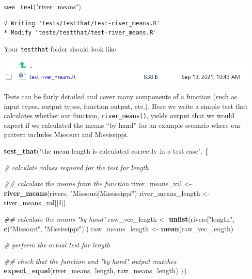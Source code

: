 \documentclass[
]{book}
\newenvironment{Shaded}{\begin{snugshade}}{\end{snugshade}}
\newcommand{\CommentTok}[1]{\textcolor[rgb]{0.56,0.35,0.01}{\textit{#1}}}
\newcommand{\DecValTok}[1]{\textcolor[rgb]{0.00,0.00,0.81}{#1}}
\newcommand{\KeywordTok}[1]{\textcolor[rgb]{0.13,0.29,0.53}{\textbf{#1}}}
\newcommand{\NormalTok}[1]{#1}
\newcommand{\StringTok}[1]{\textcolor[rgb]{0.31,0.60,0.02}{#1}}
\begin{document}
\begin{Shaded}
\begin{Highlighting}[]
\KeywordTok{use_test}\NormalTok{(}\StringTok{"river_means"}\NormalTok{)}
\end{Highlighting}
\end{Shaded}

\begin{verbatim}
√ Writing 'tests/testthat/test-river_means.R'
* Modify 'tests/testthat/test-river_means.R'
\end{verbatim}

Your \texttt{testthat} folder should look like

\includegraphics[width=1\linewidth]{images/newrpack_files5}

Tests can be fairly detailed and cover many components of a function (such as input types, output types, function output, etc.). Here we write a simple test that calculates whether our function, \texttt{river\_means()}, yields output that we would expect if we calculated the means ``by hand'' for an example scenario where our pattern includes Missouri and Mississippi.

\begin{Shaded}
\begin{Highlighting}[]
\KeywordTok{test_that}\NormalTok{(}\StringTok{"the mean length is calculated correctly in a test case"}\NormalTok{, \{}
  
  \CommentTok{# calculate values required for the test for length}

  \CommentTok{## calculate the means from the function}
\NormalTok{  river_means_val <-}\StringTok{ }\KeywordTok{river_means}\NormalTok{(rivers, }\StringTok{"Missouri|Mississippi"}\NormalTok{)}
\NormalTok{  river_means_length <-}\StringTok{ }\NormalTok{river_means_val[[}\DecValTok{1}\NormalTok{]]}

  \CommentTok{## calculate the means "by hand"}
\NormalTok{  raw_vec_length <-}\StringTok{ }\KeywordTok{unlist}\NormalTok{(rivers[}\StringTok{"length"}\NormalTok{, }\KeywordTok{c}\NormalTok{(}\StringTok{"Missouri"}\NormalTok{, }\StringTok{"Mississippi"}\NormalTok{)])}
\NormalTok{  raw_means_length <-}\StringTok{ }\KeywordTok{mean}\NormalTok{(raw_vec_length)}
  
  \CommentTok{# perform the actual test for length}

  \CommentTok{## check that the function and "by hand" output matches}
  \KeywordTok{expect_equal}\NormalTok{(river_means_length, raw_means_length)}
\NormalTok{\})}
\end{Highlighting}
\end{Shaded}
\end{document}
